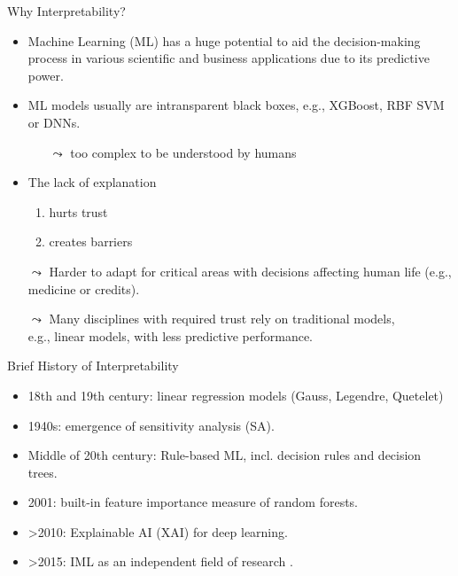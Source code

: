 \documentclass[11pt,compress,t,notes=noshow, aspectratio=169, xcolor=table]{beamer}
\begin{document}
\begin{frame}{Why Interpretability?}
		\begin{itemize}
			\item Machine Learning (ML) has a huge potential to aid the decision-making process in various scientific and business applications due to its predictive power.
			\pause
			\smallskip
			\item ML models usually are intransparent black boxes, e.g., XGBoost, RBF SVM or DNNs.
			\begin{itemize}
				\item[$\leadsto$] too complex to be understood by humans
			\end{itemize}
			\pause
			\smallskip
			\item The lack of explanation
			\begin{enumerate}
				\item hurts trust
				\item creates barriers
			\end{enumerate}  
			\pause
			\smallskip
		    \item[$\leadsto$] Harder to adapt for critical areas with decisions affecting human life (e.g., medicine or credits).
			\pause
			\item[$\leadsto$] Many disciplines with required trust rely on traditional models,\\ e.g., linear models, with less predictive performance.
		\end{itemize}
	\end{frame}
	
	
	\begin{frame}{Brief History of Interpretability}
		\begin{itemize}
			\item 18th and 19th century: linear regression models (Gauss, Legendre, Quetelet)
			\medskip
			\item 1940s: emergence of sensitivity analysis (SA).
			\medskip
			\item Middle of 20th century: Rule-based ML, incl. decision rules and decision trees.
			\medskip
			\item 2001: built-in feature importance measure of random forests.
			\medskip
			\item >2010: Explainable AI (XAI) for deep learning.
			\medskip
			\item >2015: IML as an independent field of research .
		\end{itemize}
	\end{frame}
	
\end{document}
